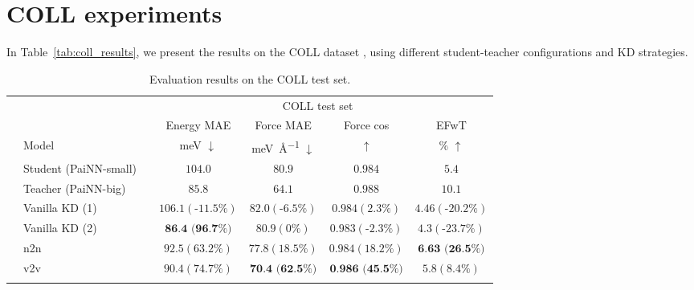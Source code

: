 \documentclass{article}
\begin{document}
\section{COLL experiments}
In Table~\ref{tab:coll_results}, we present the results on the COLL dataset \cite{gasteiger_dimenetpp_2020}, using different student-teacher configurations and KD strategies.
\label{ap:coll}
\begin{table}[H]
\centering
\caption{Evaluation results on the COLL test set.}
\begin{tabular}{llccccc}
\multicolumn{1}{c}{\multirow{3}{*}{}} & & \multicolumn{5}{c}{COLL test set} 
\\\cmidrule(r){4-7}
\multicolumn{1}{c}{}   &   &                   &      Energy MAE  &    Force MAE  & Force cos & EFwT \\
&   \multicolumn{1}{l}{Model}     &        &      \si{\milli\electronvolt} $\downarrow$   &    \si{\milli\electronvolt\per\angstrom} $\downarrow$     & $\uparrow$  & \% $\uparrow$ \\\cmidrule(r){1-7}
\parbox[t]{2mm}{} & Student (PaiNN-small)               &   &              $104.0$      &     $80.9$     &  $0.984$ &  $5.4$  \\
& Teacher (PaiNN-big)                  &   &              $85.8$        &   $64.1$     &   $0.988$      &   $10.1$    \\
& Vanilla KD (1)              &   &            $106.1 (\text{-}11.5\%)$          &          $82.0 (\text{-}6.5\%)$     &     $0.984 (2.3\%)$        &  $4.46 (\text{-}20.2\%)$    \\
& Vanilla KD (2)             &   &            $\textbf{86.4 (96.7\%)}$          &          $80.9 (0\%)$     &     $0.983 (\text{-}2.3\%)$        &  $4.3 (\text{-}23.7\%)$    \\
& n2n                &   &            $92.5 (63.2\%)$          &          $77.8 (18.5\%)$     &     $0.984 (18.2\%)$        &  $\textbf{6.63 (26.5\%)}$    \\
& v2v                       &   &            $90.4 (74.7\%)$   &          $\textbf{70.4 (62.5\%)}$     &     $\textbf{0.986 (45.5\%)}$        &  $5.8 (8.4\%)$    \\
 \\

\end{tabular}
\end{table}
\end{document}
